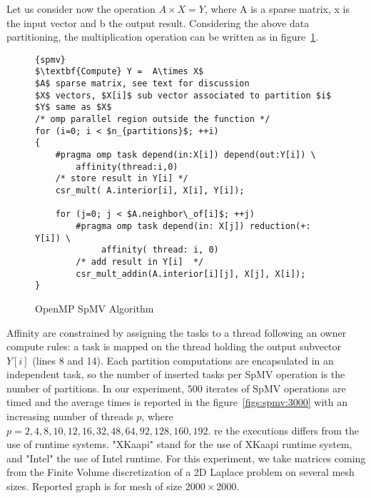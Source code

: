 \documentclass{Styles/llncs}
\begin{document}
Let us consider now the operation $A \times X = Y$, where A is a sparse matrix, x is the input vector and b the output result. Considering the above data partitioning, the multiplication operation can be written as in figure~\ref{lst:spmv}.

\begin{figure}[t]
\begin{center}
\begin{minipage}[c]{0.9\linewidth}
\small{
}
\begin{lstlisting}[frame=none,style=smaller,showlines=true,mathescape=true,firstnumber=1]{spmv}
$\textbf{Compute} Y =  A\times X$
$A$ sparse matrix, see text for discussion
$X$ vectors, $X[i]$ sub vector associated to partition $i$
$Y$ same as $X$
/* omp parallel region outside the function */
for (i=0; i < $n_{partitions}$; ++i)
{
	#pragma omp task depend(in:X[i]) depend(out:Y[i]) \
		affinity(thread:i,0)
	/* store result in Y[i] */
	csr_mult( A.interior[i], X[i], Y[i]); 

	for (j=0; j < $A.neighbor\_of[i]$; ++j)
		#pragma omp task depend(in: X[j]) reduction(+: Y[i]) \
		     affinity( thread: i, 0)
		/* add result in Y[i]  */
		csr_mult_addin(A.interior[i][j], X[j], X[i]);
}
\end{lstlisting}
\end{minipage}\hfill
\end{center}
\caption{OpenMP SpMV Algorithm} \label{lst:spmv}
\end{figure}

Affinity are constrained by assigning the tasks to a thread following an owner compute rules: a task is mapped on the thread holding the output subvector $Y[i]$ (lines 8 and 14). 
Each partition computations are encapsulated in an independent task, so the number of inserted tasks per SpMV operation is the number of partitions. 
In our experiment, $500$ iterates of SpMV operations are timed and the average times is reported in the figure~\ref{figs:spmv:3000} with an increasing number of threads $p$, where $p= {2,4,8,10,12,16,32,48,64,92,128,160,192}$. 
re the executions differs from the use of runtime systems. "XKaapi" stand for the use of XKaapi runtime system, and "Intel" the use of Intel runtime. For this experiment, we take matrices coming from the Finite Volume discretization of a 2D Laplace problem on several mesh sizes.  Reported graph is for mesh of size $2000 \times 2000$.
\end{document}
